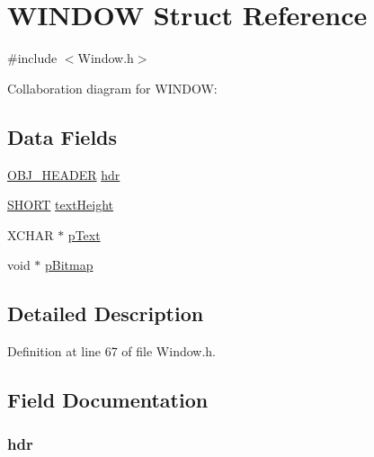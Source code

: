 \hypertarget{struct_w_i_n_d_o_w}{}\section{W\+I\+N\+D\+O\+W Struct Reference}
\label{struct_w_i_n_d_o_w}


{\ttfamily \#include $<$Window.\+h$>$}



Collaboration diagram for W\+I\+N\+D\+O\+W\+:
\subsection*{Data Fields}
\begin{DoxyCompactItemize}
\item 
\hyperlink{struct_o_b_j___h_e_a_d_e_r}{O\+B\+J\+\_\+\+H\+E\+A\+D\+E\+R} \hyperlink{struct_w_i_n_d_o_w_abeffaf353197a8a64fba6707b68ce0be}{hdr}
\item 
\hyperlink{_generic_type_defs_8h_ae9bb25d3afecf3bfab0fbe3c22c2050f}{S\+H\+O\+R\+T} \hyperlink{struct_w_i_n_d_o_w_a40fa9c35391b0005032180b85e7afd34}{text\+Height}
\item 
X\+C\+H\+A\+R $\ast$ \hyperlink{struct_w_i_n_d_o_w_a934b5563cdaf14803728ff3a7b7e8c7f}{p\+Text}
\item 
void $\ast$ \hyperlink{struct_w_i_n_d_o_w_aef9bed8e1a29e17226ccbd9a3d81f9e1}{p\+Bitmap}
\end{DoxyCompactItemize}


\subsection{Detailed Description}


Definition at line 67 of file Window.\+h.



\subsection{Field Documentation}
\hypertarget{struct_w_i_n_d_o_w_abeffaf353197a8a64fba6707b68ce0be}{}
\subsubsection[{hdr}]{ hdr}\label{struct_w_i_n_d_o_w_abeffaf353197a8a64fba6707b68ce0be}


